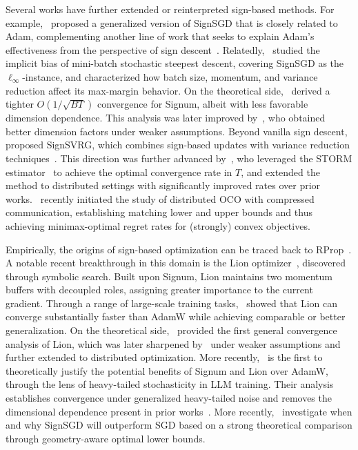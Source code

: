 \documentclass{article}
\begin{document}
Several works have further extended or reinterpreted sign-based methods. For example,~\citet{crawshaw2022robustness} proposed a generalized version of SignSGD that is closely related to Adam, complementing another line of work that seeks to explain Adam's effectiveness from the perspective of sign descent~\citep{balles2018dissecting,kunstner2023noise}. Relatedly,~\citet{li2026the} studied the implicit bias of mini-batch stochastic steepest descent, covering SignSGD as the $\ell_\infty$-instance, and characterized how batch size, momentum, and variance reduction affect its max-margin behavior. On the theoretical side,~\citet{sun2023momentum} derived a tighter $O(1/\sqrt{BT})$ convergence for Signum, albeit with less favorable dimension dependence. This analysis was later improved by~\citet{jiang2025improved}, who obtained better dimension factors under weaker assumptions. Beyond vanilla sign descent,~\citet{chzhen2023signsvrg} proposed SignSVRG, which combines sign-based updates with variance reduction techniques~\citep{NIPS2013svrg,NIPS:2013:Zhang}. This direction was further advanced by~\citet{NeurIPS:2024:Jiang}, who leveraged the STORM estimator~\citep{cutkosky2019storm} to achieve the optimal convergence rate in $T$, and extended the method to distributed settings with significantly improved rates over prior works.~\citet{yang2026distributed} recently initiated the study of distributed OCO with compressed communication, establishing matching lower and upper bounds and thus achieving minimax-optimal regret rates for (strongly) convex objectives.

Empirically, the origins of sign-based optimization can be traced back to RProp~\citep{riedmiller1993rprop}. A notable recent breakthrough in this domain is the Lion optimizer~\citep{chen2023symbolic}, discovered through symbolic search. Built upon Signum, Lion maintains two momentum buffers with decoupled roles, assigning greater importance to the current gradient. Through a range of large-scale training tasks,~\citet{chen2023symbolic} showed that Lion can converge substantially faster than AdamW while achieving comparable or better generalization. On the theoretical side,~\citet{dong2024convergence} provided the first general convergence analysis of Lion, which was later sharpened by~\citet{jiang2026lion} under weaker assumptions and further extended to distributed optimization. More recently,~\citet{yu2026signheavytails} is the first to theoretically justify the potential benefits of Signum and Lion over AdamW, through the lens of heavy-tailed stochasticity in LLM training. Their analysis establishes convergence under generalized heavy-tailed noise and removes the dimensional dependence present in prior works~\citep{dong2024convergence,jiang2026lion}. More recently,~\citet{tao2026when} investigate when and why SignSGD will outperform SGD based on a strong theoretical comparison through geometry-aware optimal lower bounds.
\end{document}

